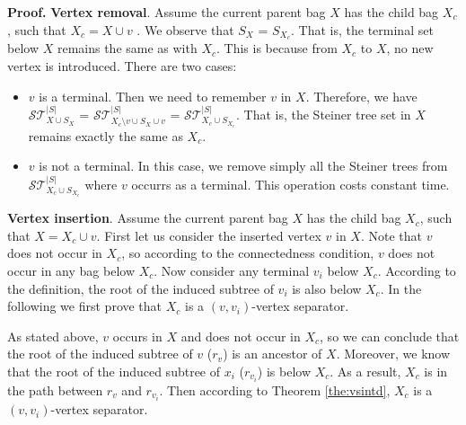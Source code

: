 \documentclass[preprint,12pt]{elsarticle}
\newenvironment{proof}{\begin{trivlist}\item[]\textbf{Proof.}}{\end{trivlist}}
\newcommand{\stset}{\mathcal{ST}}
\begin{document}
\begin{proof}
\noindent
{\bf Vertex removal}. Assume the current parent bag $X$ has the child bag
$X_c$, such that $X_c = X \cup v$ .
We observe that $S_{X}$ = $S_{X_c}$. That is, the terminal set below $X$ 
remains the same as with $X_c$. This is because from $X_c$ to $X$, no new vertex
is introduced. There are two cases:
\begin{itemize}
\item
$v$ is a terminal. Then we need to remember $v$ in $X$.
Therefore, we have $\stset_{X \cup S_{X}}^{|S|}$ = 
$\stset_{X_c \setminus v  \cup S_{X} \cup v}^{|S|}$ =
$\stset_{X_c \cup S_{X_c}}^{|S|}$.
That is, the Steiner tree set in $X$ remains exactly the same as $X_c$.
\item
$v$ is not a terminal. 
In this case, we remove simply all the Steiner trees
from $\stset_{X_c \cup S_{X_c}}^{|S|}$ where $v$ occurrs as a terminal.
This operation costs constant time.
\end{itemize}

\noindent
{\bf Vertex insertion}. Assume the current parent bag $X$ has the child bag
$X_c$, such that $X = X_c \cup v$. 
First let us consider the inserted vertex $v$ in $X$. Note that $v$ does not occur
in $X_c$, so according to the connectedness condition, $v$ does not occur
in any bag below $X_c$. Now consider any terminal  $v_i$ below $X_c$. 
According to the definition, the root of the induced subtree of $v_i$ is also below $X_c$.
In the following we first prove that $X_c$ is a $(v, v_i)$-vertex separator.


As stated above, $v$ occurs in $X$ and does not occur in $X_c$, so
we can conclude that the root of the induced subtree of $v$  ($r_v$) is an ancestor 
of $X$. Moreover, we know that the root of the induced subtree of $x_i$  ($r_{v_i}$) is below
$X_c$. As a result, $X_c$ is in the path between $r_v$ and $r_{v_i}$.
Then according to Theorem \ref{the:vsintd}, $X_c$ is a $(v, v_i)$-vertex separator.


\end{proof}
\end{document}
